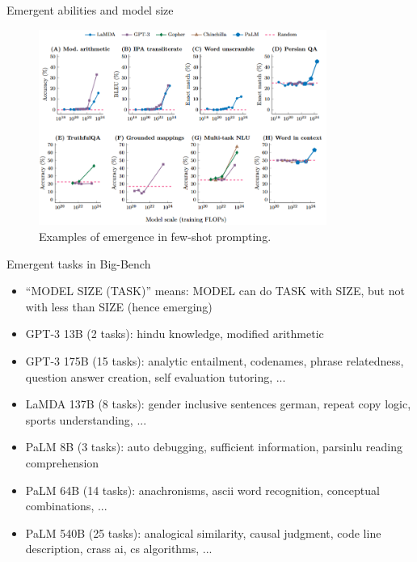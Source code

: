 \begin{vbframe}{Emergent abilities and model size}

\vfill

\begin{figure}
    \centering
    \includegraphics[width=0.84\textwidth]{figure/emergent_abilities.png}
    \caption{Examples of emergence in few-shot prompting. }
    \label{fig:emergent_abilities}
\end{figure}

\vfill

\end{vbframe}


\begin{vbframe}{Emergent tasks in Big-Bench}

\vfill

\begin{itemize}
\item ``MODEL SIZE (TASK)'' means: MODEL can do
TASK with SIZE, but not with less than SIZE (hence emerging)
    \item GPT-3 13B (2 tasks): hindu knowledge, modified arithmetic
    \item GPT-3 175B (15 tasks): analytic entailment, codenames, phrase relatedness, question answer creation, self evaluation tutoring, ...
    \item LaMDA 137B (8 tasks): gender inclusive sentences german, repeat copy logic, sports understanding, ...
    \item PaLM 8B (3 tasks): auto debugging, sufficient information, parsinlu reading comprehension
    \item PaLM 64B (14 tasks): anachronisms, ascii word recognition, conceptual combinations, ...
    \item PaLM 540B (25 tasks): analogical similarity, causal judgment, code line description, crass ai, cs algorithms, ...
\end{itemize}

\vfill

\end{vbframe}

